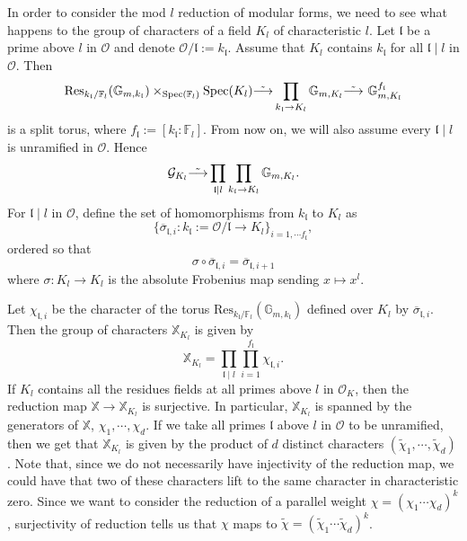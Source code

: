 \documentclass[a4paper,oneside]{amsart}
\theoremstyle{plain}
\theoremstyle{definition}
\begin{document}
In order to consider the mod $l$ reduction of modular forms, we need to see what happens to the group of characters of a field $K_l$ of characteristic $l$. Let $\mathfrak{l}$ be a prime above $l$ in $\mathcal{O}$ and denote $\mathcal{O}/\mathfrak{l}:= k_\mathfrak{l}$. Assume that $K_ l$ contains $k_\mathfrak{l}$ for all $\mathfrak{l} \mid l$ in $\mathcal{O}$. Then 
\begin{equation*}
     \text{Res}_{k_\mathfrak{l}/\mathbb{F}_l}(\mathbb{G}_{m,k_\mathfrak{l}}) \times_{\text{Spec}(\mathbb{F}_l)} \text{Spec}(K_l) \Tilde{\longrightarrow} \prod_{k_\mathfrak{l} \rightarrow K_l} \mathbb{G}_{m, K_l} \Tilde{\longrightarrow} \ \mathbb{G}^{f_\mathfrak{l}}_{m,K_l}
\end{equation*}
is a split torus, where $f_\mathfrak{l} := [k_\mathfrak{l}:\mathbb{F}_l]$. From now on, we will also assume every $\mathfrak{l} \mid l$ is unramified in $\mathcal{O}$. Hence
\begin{equation*}
    \mathcal{G}_{K_l} \Tilde{\longrightarrow} \prod_{\mathfrak{l}\mid l} \prod_{k_\mathfrak{l} \rightarrow K_l} \mathbb{G}_{m, K_l}.
\end{equation*}
 For $\mathfrak{l} \mid l$ in $\mathcal{O}$, define the set of homomorphisms from $k_\mathfrak{l}$ to $K_l$ as
 \begin{equation*}
     \{\overline{\sigma}_{\mathfrak{l},i} : k_\mathfrak{l} := \mathcal{O}/\mathfrak{l} \rightarrow K_l \}_{i=1, \cdots f_{\mathfrak{l}}},
 \end{equation*}
 ordered so that
 \begin{equation*}
     \sigma \circ \overline{\sigma}_{\mathfrak{l},i} = \overline{\sigma}_{\mathfrak{l},i+1} 
 \end{equation*}
 where $\sigma: K_{l} \rightarrow K_{l}$ is the absolute Frobenius map sending $x \mapsto x^l$.
 
 Let $\chi_{\mathfrak{l},i}$ be the character of the torus $\text{Res}_{k_{\mathfrak{l}}/\mathbb{F}_l}(\mathbb{G}_{m, k_\mathfrak{l}})$ defined over $K_l$ by $\overline{\sigma}_{\mathfrak{l},i}$. Then the group of characters $\mathbb{X}_{K_l}$ is given by
\begin{equation*}
    \mathbb{X}_{K_l} = \prod_{\mathfrak{l} \mid l} \prod_{i=1}^{f_\mathfrak{l}} \chi_{\mathfrak{l},i}.
\end{equation*}
If $K_l$ contains all the residues fields at all primes above $l$ in $\mathcal{O}_K$, then the reduction map $\mathbb{X} \rightarrow \mathbb{X}_{K_l}$ is surjective. In particular, $\mathbb{X}_{K_l}$ is spanned by the generators of $\mathbb{X}$, $\chi_1, \cdots, \chi_d$. If we take all primes $\mathfrak{l}$ above $l$ in $\mathcal{O}$ to be unramified, then we get that $\mathbb{X}_{K_l}$ is given by the product of $d$ distinct characters $(\tilde{\chi}_1, \cdots , \tilde{\chi}_d)$. Note that, since we do not necessarily have injectivity of the reduction map, we could have that two of these characters lift to the same character in characteristic zero. Since we want to consider the reduction of a parallel weight $\chi = (\chi_1 \cdots \chi_d)^k$, surjectivity of reduction tells us that $\chi$ maps to $\tilde{\chi}=(\tilde{\chi}_1\cdots \tilde{\chi}_d)^k$.
\end{document}
